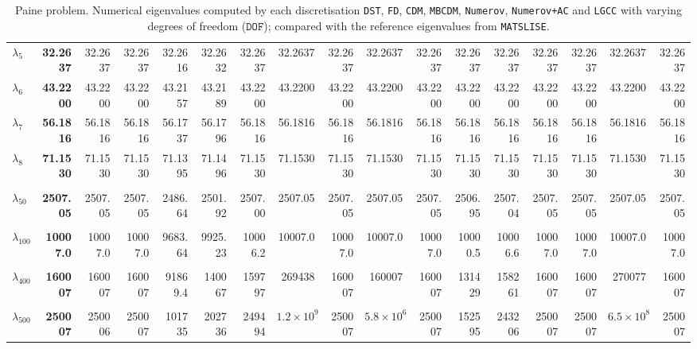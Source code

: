 \begin{table}[htbp]
{{\begin{tabular}{lrrrrrrrrrrrrrrrr}
      $\lambda_{5}$ & \textbf{32.2637} & 32.2637 & 32.2637 & 32.2616 & 32.2632 & 32.2637 & 32.2637 & 32.2637 & 32.2637 & 32.2637 & 32.2637 & 32.2637 & 32.2637 & 32.2637 & 32.2637 & 32.2637 \\
      $\lambda_{6}$ & \textbf{43.2200} & 43.2200 & 43.2200 & 43.2157 & 43.2189 & 43.2200 & 43.2200 & 43.2200 & 43.2200 & 43.2200 & 43.2200 & 43.2200 & 43.2200 & 43.2200 & 43.2200 & 43.2200 \\
      $\lambda_{7}$ & \textbf{56.1816} & 56.1816 & 56.1816 & 56.1737 & 56.1796 & 56.1816 & 56.1816 & 56.1816 & 56.1816 & 56.1816 & 56.1816 & 56.1816 & 56.1816 & 56.1816 & 56.1816 & 56.1816 \\
      $\lambda_{8}$ & \textbf{71.1530} & 71.1530 & 71.1530 & 71.1395 & 71.1496 & 71.1530 & 71.1530 & 71.1530 & 71.1530 & 71.1530 & 71.1530 & 71.1530 & 71.1530 & 71.1530 & 71.1530 & 71.1530 \\
      & & & & & & & & & & & & & & & & \\
      $\lambda_{50}$ & \textbf{2507.05} & 2507.05 & 2507.05 & 2486.64 & 2501.92 & 2507.00 & 2507.05 & 2507.05 & 2507.05 & 2507.05 & 2506.95 & 2507.04 & 2507.05 & 2507.05 & 2507.05 & 2507.05 \\
      & & & & & & & & & & & & & & & & \\
      $\lambda_{100}$ & \textbf{10007.0} & 10007.0 & 10007.0 & 9683.64 & 9925.23 & 10006.2 & 10007.0 & 10007.0 & 10007.0 & 10007.0 & 10000.5 & 10006.6 & 10007.0 & 10007.0 & 10007.0 & 10007.0 \\
      & & & & & & & & & & & & & & & & \\
      $\lambda_{400}$ & \textbf{160007} & 160007 & 160007 & 91869.4 & 140067 & 159797 & 269438 & 160007 & 160007 & 160007 & 131429 & 158261 & 160007 & 160007 & 270077 & 160007 \\
      & & & & & & & & & & & & & & & & \\
      $\lambda_{500}$ & \textbf{250007} & 250006 & 250007 & 101735 & 202736 & 249494 & $1.2 \times 10^{9}$ & 250007 & $5.8 \times 10^{6}$ & 250007 & 152595 & 243206 & 250007 & 250007 & $6.5 \times 10^{8}$ & 250007 \\
      \bottomrule
    \end{tabular}}}
  \caption{Paine problem. Numerical eigenvalues computed by each discretisation \texttt{DST}, \texttt{FD}, \texttt{CDM}, \texttt{MBCDM}, \texttt{Numerov}, \texttt{Numerov+AC} and \texttt{LGCC} with varying degrees of freedom ($\mathtt{DOF}$); compared with the reference eigenvalues from \texttt{MATSLISE}.}
  \label{tab:eigenvalues_head_paine_transposed_one_table}
\end{table}
